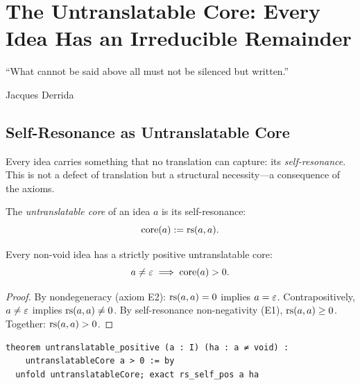 

\chapter{The Untranslatable Core: Every Idea Has an Irreducible Remainder}
\label{ch:untranslatable}

\epigraph{``What cannot be said above all must not be silenced but
written.''}{Jacques Derrida}

\section{Self-Resonance as Untranslatable Core}

Every idea carries something that no translation can capture: its
\emph{self-resonance}.  This is not a defect of translation but a
structural necessity---a consequence of the axioms.

\begin{definition}
The \emph{untranslatable core} of an idea $a$ is its self-resonance:
\[
  \mathrm{core}(a) := \mathrm{rs}(a, a).
\]
\end{definition}

\begin{theorem}
\label{thm:positive-core}
Every non-void idea has a strictly positive untranslatable core:
\[
  a \neq \varepsilon \implies \mathrm{core}(a) > 0.
\]
\end{theorem}

\begin{proof}
By nondegeneracy (axiom E2): $\mathrm{rs}(a, a) = 0$ implies $a = \varepsilon$.
Contrapositively, $a \neq \varepsilon$ implies $\mathrm{rs}(a, a) \neq 0$.
By self-resonance non-negativity (E1), $\mathrm{rs}(a, a) \geq 0$.
Together: $\mathrm{rs}(a, a) > 0$.
\end{proof}

\begin{lstlisting}
theorem untranslatable_positive (a : I) (ha : a ≠ void) :
    untranslatableCore a > 0 := by
  unfold untranslatableCore; exact rs_self_pos a ha
\end{lstlisting}

